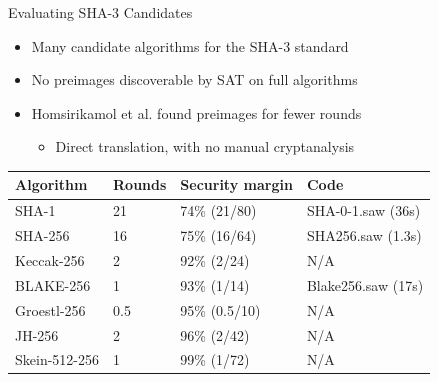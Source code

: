 \documentclass[ignorenonframetext,]{beamer}
\providecommand{\tightlist}{%
  \setlength{\itemsep}{0pt}\setlength{\parskip}{0pt}}
\newcommand{\filelink}[1]{{\alert{#1}}}
\begin{document}
\begin{frame}{Evaluating SHA-3 Candidates}

\begin{itemize}
\tightlist
\item
  Many candidate algorithms for the SHA-3 standard
\item
  No preimages discoverable by SAT on full algorithms
\item
  Homsirikamol et al. found preimages for fewer rounds \cite{homsirikamol2012sha3}

  \begin{itemize}
  \tightlist
  \item
    Direct translation, with no manual cryptanalysis
  \end{itemize}
\end{itemize}

\begin{longtable}[c]{@{}llll@{}}
\toprule
Algorithm & Rounds & Security margin & Code\tabularnewline
\midrule
\endhead
SHA-1 & 21 & 74\% (21/80) & \filelink{SHA-0-1.saw} (36s)\tabularnewline
SHA-256 & 16 & 75\% (16/64) & \filelink{SHA256.saw}
(1.3s)\tabularnewline
Keccak-256 & 2 & 92\% (2/24) & N/A\tabularnewline
BLAKE-256 & 1 & 93\% (1/14) & \filelink{Blake256.saw}
(17s)\tabularnewline
Groestl-256 & 0.5 & 95\% (0.5/10) & N/A\tabularnewline
JH-256 & 2 & 96\% (2/42) & N/A\tabularnewline
Skein-512-256 & 1 & 99\% (1/72) & N/A\tabularnewline
\bottomrule
\end{longtable}

\end{frame}
\end{document}
